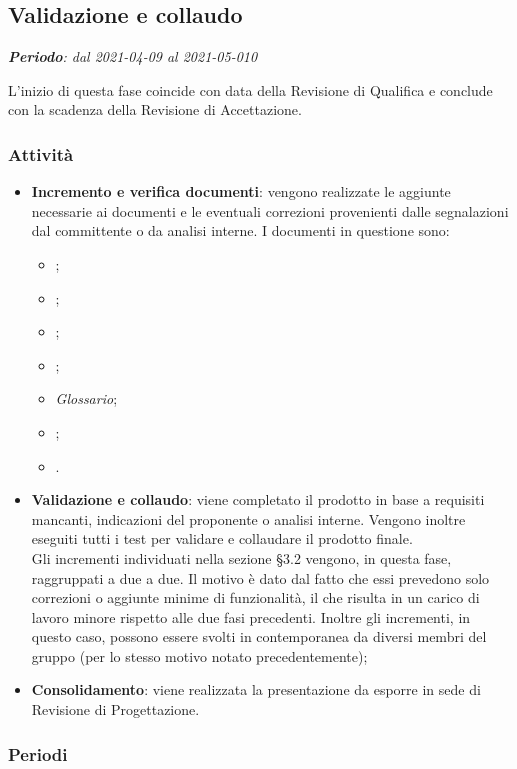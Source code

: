 \subsection{Validazione e collaudo}
\textit{\textbf{Periodo}: dal 2021-04-09 al 2021-05-010}

L'inizio di questa fase coincide con data della Revisione di Qualifica e conclude con la scadenza della Revisione di Accettazione.

\subsubsection{Attività}

\begin{itemize}
\item \textbf{Incremento e verifica documenti}: vengono realizzate le aggiunte necessarie ai documenti e le eventuali correzioni provenienti dalle segnalazioni dal committente o da analisi interne. I documenti in questione sono:
\begin{itemize}
\item \NdP{};
\item \AdR{};
\item \PdQ{};
\item \PdP{};
\item \textit{Glossario};
\item \MU{};
\item \MM{}.
\end{itemize}
\item \textbf{Validazione e collaudo}: viene completato il prodotto in base a requisiti mancanti, indicazioni del proponente o analisi interne. Vengono inoltre eseguiti tutti i test per validare e collaudare il prodotto finale.\\ Gli incrementi individuati nella sezione \S{3.2} vengono, in questa fase, raggruppati a due a due. Il motivo è dato dal fatto che essi prevedono solo correzioni o aggiunte minime di funzionalità, il che risulta in un carico di lavoro minore rispetto alle due fasi precedenti. Inoltre gli incrementi, in questo caso, possono essere svolti in contemporanea da diversi membri del gruppo (per lo stesso motivo notato precedentemente);
\item \textbf{Consolidamento}: viene realizzata la presentazione da esporre in sede di Revisione di Progettazione.
\end{itemize}

\subsubsection{Periodi}

